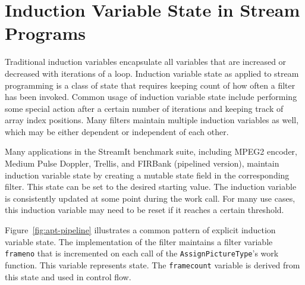 \section{Induction Variable State in Stream Programs}
\label{sec:inductionstate}

  




Traditional induction variables encapsulate all variables that are
increased or decreased with iterations of a loop.  Induction variable
state as applied to stream programming is a class of state that
requires keeping count of how often a filter has been invoked.  Common
usage of induction variable state include performing some special
action after a certain number of iterations and keeping track of array
index positions.  Many filters maintain multiple induction variables
as well, which may be either dependent or independent of each other.

Many applications in the StreamIt benchmark suite, including MPEG2 encoder,
Medium Pulse Doppler, Trellis, and FIRBank (pipelined version), maintain induction variable state 
by creating a mutable state field in the corresponding filter.  This
state can be set to the desired starting value.  The induction
variable is consistently updated at some point during the work call.
For many use cases, this induction variable may need to be reset if it
reaches a certain threshold. 

Figure~\ref{fig:apt-pipeline} illustrates a common pattern of explicit
induction variable state.  The implementation of the filter maintains
a filter variable {\tt frameno} that is incremented on each call of
the {\tt AssignPictureType}'s work function.  This variable
represents state.  The {\tt framecount} variable is derived
from this state and used in control flow.

